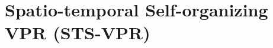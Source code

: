 \documentclass[letterpaper, 10 pt, conference]{ieeeconf}  %
\begin{document}




\section{Spatio-temporal Self-organizing VPR (STS-VPR)}

\end{document}
